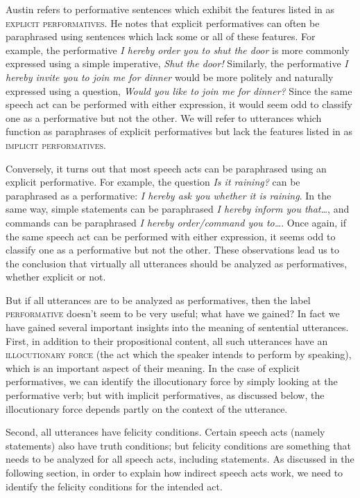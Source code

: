 Austin refers to performative sentences which exhibit the features listed in  as \textsc{explicit performatives}. He notes that explicit performatives can often be paraphrased using sentences which lack some or all of these features. For example, the performative \textit{I hereby order you to shut the door} is more commonly expressed using a simple imperative, \textit{Shut the door!} Similarly, the performative \textit{I hereby invite you to join me for dinner} would be more politely and naturally expressed using a question, \textit{Would you like to join me for dinner?} Since the same speech act can be performed with either expression, it would seem odd to classify one as a performative but not the other. We will refer to utterances which function as paraphrases of explicit performatives but lack the features listed in  as \textsc{implicit performatives}.



Conversely, it turns out that most speech acts can be paraphrased using an explicit performative. For example, the question \textit{Is it raining?} can be paraphrased as a performative: \textit{I hereby ask you whether it is raining}. In the same way, simple statements can be paraphrased \textit{I hereby inform you that…}, and commands can be paraphrased \textit{I hereby order/command you to…}. Once again, if the same speech act can be performed with either expression, it seems odd to classify one as a performative but not the other. These observations lead us to the conclusion that virtually all utterances should be analyzed as performatives, whether explicit or not.



But if all utterances are to be analyzed as performatives, then the label \textsc{performative} doesn’t seem to be very useful; what have we gained? In fact we have gained several important insights into the meaning of sentential utterances. First, in addition to their propositional content, all such utterances have an \textsc{illocutionary force} (the act which the speaker intends to perform by speaking), which is an important aspect of their meaning. In the case of explicit performatives, we can identify the illocutionary force by simply looking at the performative verb; but with implicit performatives, as discussed below, the illocutionary force depends partly on the context of the utterance.



Second, all utterances have felicity conditions. Certain speech acts (namely statements) also have truth conditions; but felicity conditions are something that needs to be analyzed for all speech acts, including statements. As discussed in the following section, in order to explain how indirect speech acts work, we need to identify the felicity conditions for the intended act.



